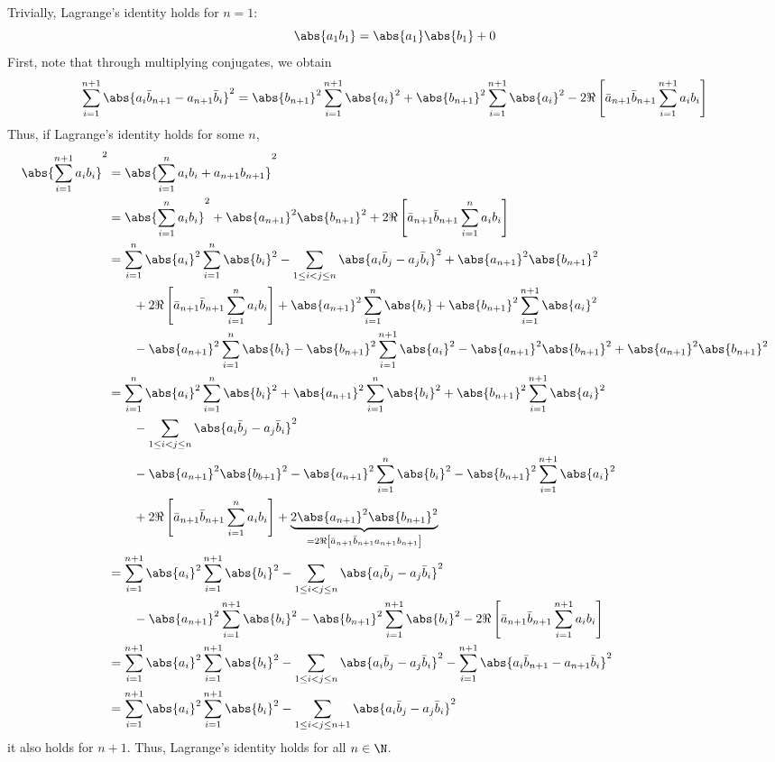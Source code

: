 \subsubsection{}
Trivially, Lagrange's identity holds for \(n=1\):
\[\abs{a_1b_1}=\abs{a_1}\abs{b_1}+0\]
First, note that through multiplying conjugates, we obtain
\[\sum_{i=1}^{n+1}\abs{a_i\bar b_{n+1}-a_{n+1}\bar b_i}^2=\abs{b_{n+1}}^2\sum_{i=1}^{n+1}\abs{a_i}^2+\abs{b_{n+1}}^2\sum_{i=1}^{n+1}\abs{a_i}^2-2\Re\left[\bar a_{n+1}\bar b_{n+1}\sum_{i=1}^{n+1}a_ib_i\right]\]
Thus, if Lagrange's identity holds for some \(n\),
\begin{align*}
	\abs{\sum_{i=1}^{n+1}a_ib_i}^2&=\abs{\sum_{i=1}^na_ib_i+a_{n+1}b_{n+1}}^2\\
				      &=\abs{\sum_{i=1}^{n}a_i b_i}^2 + \abs{a_{n+1}}^2\abs{b_{n+1}}^2+2\Re\left[\bar a_{n+1}\bar b_{n+1}\sum_{i=1}^{n}a_ib_i\right]\\
				      &=\sum_{i=1}^{n}\abs{a_i}^2\sum_{i=1}^n\abs{b_i}^2 - \sum_{1\leq i < j \leq n}\abs{a_i\bar b_j - a_j\bar b_i}^2+ \abs{a_{n+1}}^2\abs{b_{n+1}}^2\\
				      &\qquad+2\Re\left[\bar a_{n+1}\bar b_{n+1}\sum_{i=1}^{n}a_ib_i\right] + \abs{a_{n+1}}^2\sum_{i=1}^n\abs{b_i} +\abs{b_{n+1}}^2\sum_{i=1}^{n+1}\abs{a_i}^2 \\
				      &\qquad - \abs{a_{n+1}}^2\sum_{i=1}^n\abs{b_i} -\abs{b_{n+1}}^2\sum_{i=1}^{n+1}\abs{a_i}^2- \abs{a_{n+1}}^2\abs{b_{n+1}}^2+ \abs{a_{n+1}}^2\abs{b_{n+1}}^2\\
				      &=\sum_{i=1}^{n}\abs{a_i}^2\sum_{i=1}^n\abs{b_i}^2 + \abs{a_{n+1}}^2\sum_{i=1}^n\abs{b_i}^2 +\abs{b_{n+1}}^2\sum_{i=1}^{n+1}\abs{a_i}^2 \\
				      &\qquad - \sum_{1\leq i < j \leq n}\abs{a_i\bar b_j - a_j\bar b_i}^2\\
				      &\qquad -\abs{a_{n+1}}^2\abs{b_{b+1}}^2- \abs{a_{n+1}}^2\sum_{i=1}^n\abs{b_i}^2 -\abs{b_{n+1}}^2\sum_{i=1}^{n+1}\abs{a_i}^2\\
				      &\qquad+2\Re\left[\bar a_{n+1}\bar b_{n+1}\sum_{i=1}^{n}a_ib_i\right] +\underbrace{2\abs{a_{n+1}}^2\abs{b_{n+1}}^2}_{=2\Re\left[\bar a_{n+1}\bar b_{n+1}a_{n+1}b_{n+1} \right]}\\
				      &=\sum_{i=1}^{n+1}\abs{a_i}^2\sum_{i=1}^{n+1}\abs{b_i}^2 - \sum_{1\leq i < j \leq n}\abs{a_i\bar b_j - a_j\bar b_i}^2\\
				      &\qquad -\abs{a_{n+1}}^2\sum_{i=1}^{n+1}\abs{b_i}^2-\abs{b_{n+1}}^2\sum_{i=1}^{n+1}\abs{b_i}^2-2\Re\left[\bar a_{n+1}\bar b_{n+1}\sum_{i=1}^{n+1}a_ib_i\right]\\
				      &=\sum_{i=1}^{n+1}\abs{a_i}^2\sum_{i=1}^{n+1}\abs{b_i}^2 - \sum_{1\leq i < j \leq n}\abs{a_i\bar b_j - a_j\bar b_i}^2 -\sum_{i=1}^{n+1}\abs{a_i\bar b_{n+1}-a_{n+1}\bar b_i}^2\\
				      &=\sum_{i=1}^{n+1}\abs{a_i}^2\sum_{i=1}^{n+1}\abs{b_i}^2 - \sum_{1\leq i < j \leq n+1}\abs{a_i\bar b_j - a_j\bar b_i}^2
\end{align*}
it also holds for \(n+1\). Thus, Lagrange's identity holds for all \(n\in \N\).
